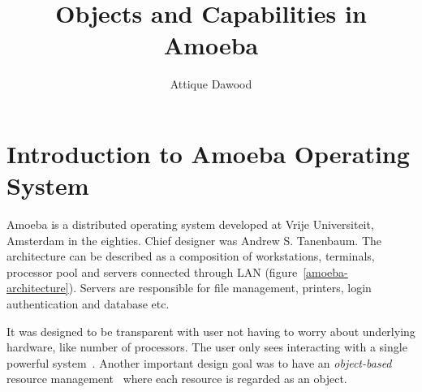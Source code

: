\documentclass[11pt,a4paper]{article}
\begin{document}
\title{Objects and Capabilities in Amoeba}
\author{Attique Dawood}
\maketitle

\section{Introduction to Amoeba Operating System}

Amoeba is a distributed operating system developed at Vrije Universiteit, Amsterdam in the eighties. Chief designer was Andrew S. Tanenbaum. The architecture can be described as a composition of workstations, terminals, processor pool and servers connected through LAN (figure~\ref{amoeba-architecture}). Servers are responsible for file management, printers, login authentication and database etc.

It was designed to be transparent with user not having to worry about underlying hardware, like number of processors. The user only sees interacting with a single powerful system~\cite{amoeba-sourceforge}. Another important design goal was to have an \emph{object-based} resource management~\cite{distributed-systems-book} where each resource is regarded as an object.
\end{document}
